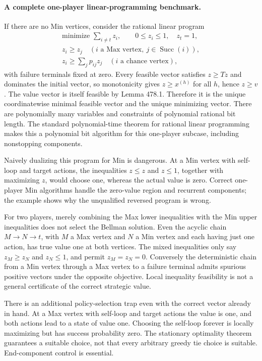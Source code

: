 \documentclass[11pt]{article}
\begin{document}
\paragraph{A complete one-player linear-programming benchmark.}
If there are no Min vertices, consider the rational linear program
\begin{equation}\label{a478:LP}
 \begin{gathered}
 \text{minimize }\sum_{i\ne t}z_i,\qquad 0\leq z_i\leq1,
 \quad z_t=1,\\
 z_i\geq z_j\quad(i\text{ a Max vertex},\ j\in\operatorname{Succ}(i)),\\
 z_i\geq\sum_jp_{ij}z_j\quad(i\text{ a chance vertex}),
 \end{gathered}
\end{equation}
with failure terminals fixed at zero. Every feasible vector satisfies
$z\geq Tz$ and dominates the initial vector, so monotonicity gives
$z\geq x^{(h)}$ for all $h$, hence $z\geq v$. The value vector is
itself feasible by Lemma 478.1. Therefore it is the unique coordinatewise
minimal feasible vector and the unique minimizing vector. There are
polynomially many variables and constraints of polynomial rational bit
length. The standard polynomial-time theorem for rational linear
programming makes this a polynomial bit algorithm for this one-player
subcase, including nonstopping components.

Naively dualizing this program for Min is dangerous. At a Min vertex
with self-loop and target actions, the inequalities $z\leq z$ and
$z\leq1$, together with maximizing $z$, would choose one, whereas
the actual value is zero. Correct one-player Min algorithms handle the
zero-value region and recurrent components; the example shows why the
unqualified reversed program is wrong.

For two players, merely combining the Max lower inequalities with the
Min upper inequalities does not select the Bellman solution. Even the
acyclic chain $M\to N\to t$, with $M$ a Max vertex and $N$ a Min
vertex and each having just one action, has true value one at both
vertices. The mixed inequalities only say $z_M\geq z_N$ and
$z_N\leq1$, and permit $z_M=z_N=0$. Conversely the deterministic
chain from a Min vertex through a Max vertex to a failure terminal admits
spurious positive vectors under the opposite objective. Local inequality
feasibility is not a general certificate of the correct strategic value.

There is an additional policy-selection trap even with the correct vector
already in hand. At a Max vertex with self-loop and target actions the
value is one, and both actions lead to a state of value one. Choosing
the self-loop forever is locally maximizing but has success probability
zero. The stationary optimality theorem guarantees a suitable choice,
not that every arbitrary greedy tie choice is suitable. End-component
control is essential.
\end{document}
